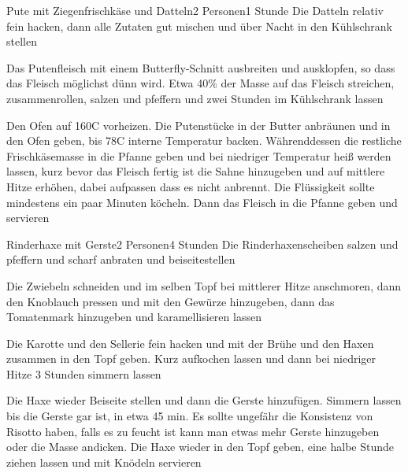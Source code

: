 
\begin{recipe}{Pute mit Ziegenfrischkäse und Datteln}{2 Personen}{1 Stunde}
Die Datteln relativ fein hacken, dann alle Zutaten gut mischen und über Nacht in den Kühlschrank stellen

Das Putenfleisch mit einem Butterfly-Schnitt ausbreiten und ausklopfen, so dass das Fleisch möglichst dünn wird. Etwa 40\% der Masse auf das Fleisch streichen, zusammenrollen, salzen und pfeffern und zwei Stunden im Kühlschrank lassen

Den Ofen auf 160\0C vorheizen. Die Putenstücke in der Butter anbräunen und in den Ofen geben, bis 78\0C interne Temperatur backen. Währenddessen die restliche Frischkäsemasse in die Pfanne geben und bei niedriger Temperatur heiß werden lassen, kurz bevor das Fleisch fertig ist die Sahne hinzugeben und auf mittlere Hitze erhöhen, dabei aufpassen dass es nicht anbrennt. Die Flüssigkeit sollte mindestens ein paar Minuten köcheln. Dann das Fleisch in die Pfanne geben und servieren

\end{recipe}


\begin{recipe}{Rinderhaxe mit Gerste}{2 Personen}{4 Stunden}
Die Rinderhaxenscheiben salzen und pfeffern und scharf anbraten und beiseitestellen

Die Zwiebeln schneiden und im selben Topf bei mittlerer Hitze anschmoren, dann den Knoblauch pressen und  mit den Gewürze hinzugeben, dann das Tomatenmark hinzugeben und karamellisieren lassen

Die Karotte und den Sellerie fein hacken und mit der Brühe und den Haxen zusammen in den Topf geben. Kurz aufkochen lassen und dann bei niedriger Hitze 3 Stunden simmern lassen

Die Haxe wieder Beiseite stellen und dann die Gerste hinzufügen.
Simmern lassen bis die Gerste gar ist, in etwa 45 min. Es sollte ungefähr die Konsistenz von Risotto haben, falls es zu feucht ist kann man etwas mehr Gerste hinzugeben oder die Masse andicken.
Die Haxe wieder in den Topf geben, eine halbe Stunde ziehen lassen und mit Knödeln servieren
\end{recipe}

